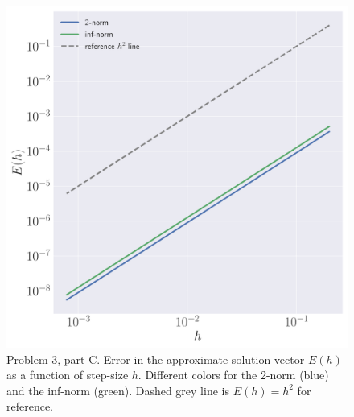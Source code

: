 \documentclass[12pt]{article}
\begin{document}
\begin{figure}[!h]
	\centering
	\includegraphics[clip, scale=0.40]{q3c_fig.pdf}
	\caption{
		Problem 3, part C. Error in the approximate solution vector $E(h)$ as a function of step-size $h$. Different colors for the 2-norm (blue) and the inf-norm (green). Dashed grey line is $E(h) = h^{2}$ for reference.
	}
\end{figure}
\end{document}
